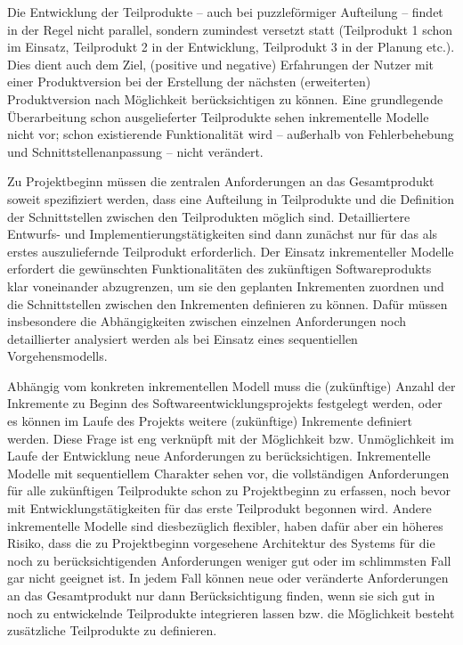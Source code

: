 Die Entwicklung der Teilprodukte – auch bei puzzleförmiger Aufteilung – findet in der Regel nicht parallel, sondern zumindest versetzt statt (\zb Teilprodukt 1 schon im Einsatz, Teilprodukt 2 in der Entwicklung, Teilprodukt 3 in der Planung etc.). Dies dient auch dem Ziel, (positive und negative) Erfahrungen der Nutzer mit einer Produktversion bei der Erstellung der nächsten (erweiterten) Produktversion nach Möglichkeit berücksichtigen zu können. Eine grundlegende Überarbeitung schon ausgelieferter Teilprodukte sehen inkrementelle Modelle nicht vor; schon existierende Funktionalität wird – außerhalb von Fehlerbehebung und Schnittstellenanpassung – nicht verändert.

Zu Projektbeginn müssen die zentralen Anforderungen an das Gesamtprodukt soweit spezifiziert werden, dass eine Aufteilung in Teilprodukte und die Definition der Schnittstellen zwischen den Teilprodukten möglich sind. Detailliertere Entwurfs- und Implementierungstätigkeiten sind dann zunächst nur für das als erstes auszuliefernde Teilprodukt erforderlich. Der Einsatz inkrementeller Modelle erfordert die gewünschten Funktionalitäten des zukünftigen Softwareprodukts klar voneinander abzugrenzen, um sie den geplanten Inkrementen zuordnen und die Schnittstellen zwischen den Inkrementen definieren zu können. Dafür müssen insbesondere die Abhängigkeiten zwischen einzelnen Anforderungen noch detaillierter analysiert werden als bei Einsatz eines sequentiellen Vorgehensmodells. 

Abhängig vom konkreten inkrementellen Modell muss die (zukünftige) Anzahl der Inkremente zu Beginn des Softwareentwicklungsprojekts festgelegt werden, oder es können im Laufe des Projekts weitere (zukünftige) Inkremente definiert werden. Diese Frage ist eng verknüpft mit der Möglichkeit bzw. Unmöglichkeit im Laufe der Entwicklung neue Anforderungen zu berücksichtigen. Inkrementelle Modelle mit sequentiellem Charakter sehen vor, die vollständigen Anforderungen für alle zukünftigen Teilprodukte schon zu Projektbeginn zu erfassen, noch bevor mit Entwicklungstätigkeiten für das erste Teilprodukt begonnen wird. Andere inkrementelle Modelle sind diesbezüglich flexibler, haben dafür aber ein höheres Risiko, dass die zu Projektbeginn vorgesehene Architektur des Systems für die noch zu berücksichtigenden Anforderungen weniger gut oder im schlimmsten Fall gar nicht geeignet ist. In jedem Fall können neue oder veränderte Anforderungen an das Gesamtprodukt nur dann Berücksichtigung finden, wenn sie sich gut in noch zu entwickelnde Teil\-produkte integrieren lassen bzw. die Möglichkeit besteht zusätzliche Teilprodukte zu definieren. 

